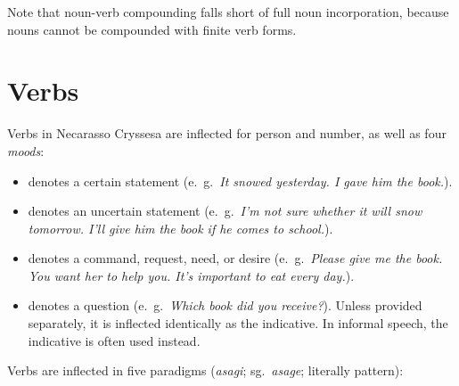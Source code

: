 \documentclass{book}
\begin{document}
Note that noun-verb compounding falls short of full noun incorporation, because nouns cannot be compounded with finite verb forms.

\chapter{Verbs}

Verbs in Necarasso Cryssesa are inflected for person and number, as well as four \emph{moods}:


\begin{itemize}
  \item {} denotes a certain statement (e.~g.~\emph{It snowed yesterday. I gave him the book.}).
  \item {} denotes an uncertain statement (e.~g.~\emph{I'm not sure whether it will snow tomorrow. I'll give him the book if he \emph{comes to school}.}).
  \item {} denotes a command, request, need, or desire (e.~g.~\emph{Please give me the book. You want her to help you. It's important to eat every day.}).
  \item {} denotes a question (e.~g.~\emph{Which book did you receive?}). Unless provided separately, it is inflected identically as the indicative. In informal speech, the indicative is often used instead.
\end{itemize}

Verbs are inflected in five paradigms (\emph{asagi}; sg.~\emph{asage}; literally pattern): \\
\end{document}
